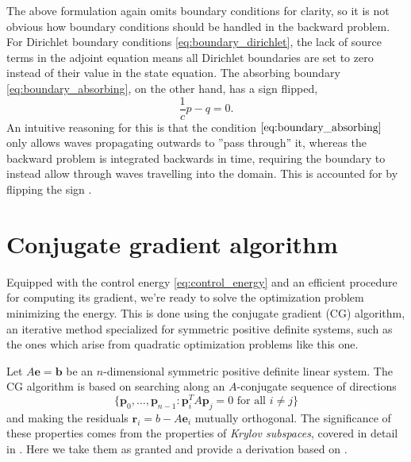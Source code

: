 \documentclass[utf8,english]{gradu3}
\begin{document}
The above formulation again omits boundary conditions for clarity,
so it is not obvious how boundary conditions should be handled in the backward problem.
For Dirichlet boundary conditions \eqref{eq:boundary_dirichlet},
the lack of source terms in the adjoint equation means
all Dirichlet boundaries are set to zero instead of their value in the state equation.
The absorbing boundary \eqref{eq:boundary_absorbing}, on the other hand,
has a sign flipped,
\begin{equation}\label{eq:adjoint_boundary_absorbing}
  \frac{1}{c}p - q = 0.
\end{equation}
An intuitive reasoning for this is that the condition $\eqref{eq:boundary_absorbing}$
only allows waves propagating outwards to ''pass through'' it,
whereas the backward problem is integrated backwards in time,
requiring the boundary to instead allow through waves travelling into the domain.
This is accounted for by flipping the sign \parencite{givoli_tutorial_2021}.


\section{Conjugate gradient algorithm}

Equipped with the control energy \eqref{eq:control_energy}
and an efficient procedure for computing its gradient,
we're ready to solve the optimization problem minimizing the energy.
This is done using the conjugate gradient (CG) algorithm,
an iterative method specialized for symmetric positive definite systems,
such as the ones which arise from quadratic optimization problems like this one.

Let $A\mathbf{e} = \mathbf{b}$ be an $n$-dimensional symmetric positive definite linear system.
The CG algorithm is based on searching along an $A$-conjugate sequence of directions
\begin{equation}\label{eq:cg_search_directions}
  \{\mathbf{p}_0, \dots, \mathbf{p}_{n-1} : \mathbf{p}_i^T A \mathbf{p}_j = 0 \text{ for all } i \neq j\}
\end{equation}
and making the residuals $\mathbf{r}_i = b - A\mathbf{e}_i$ mutually orthogonal.
The significance of these properties comes from the properties of \textit{Krylov subspaces},
covered in detail in \parencite{saad_iterative_2003}.
Here we take them as granted and provide a derivation
based on \parencite[p. 199-200]{saad_iterative_2003}.
\end{document}
